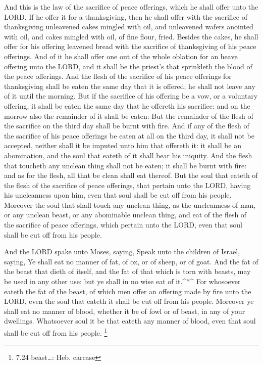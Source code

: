  And this is the law of the sacrifice of peace offerings,
which he shall offer unto the LORD.  If he offer it for a
thanksgiving, then he shall offer with the sacrifice of thanksgiving
unleavened cakes mingled with oil, and unleavened wafers anointed with
oil, and cakes mingled with oil, of fine flour, fried. 
Besides the cakes, he shall offer for his offering leavened bread with
the sacrifice of thanksgiving of his peace offerings.  And
of it he shall offer one out of the whole oblation for an heave offering
unto the LORD, and it shall be the priest's that sprinkleth the blood of
the peace offerings.  And the flesh of the sacrifice of his
peace offerings for thanksgiving shall be eaten the same day that it is
offered; he shall not leave any of it until the morning. 
But if the sacrifice of his offering be a vow, or a voluntary offering,
it shall be eaten the same day that he offereth his sacrifice: and on
the morrow also the remainder of it shall be eaten:  But
the remainder of the flesh of the sacrifice on the third day shall be
burnt with fire.  And if any of the flesh of the sacrifice
of his peace offerings be eaten at all on the third day, it shall not be
accepted, neither shall it be imputed unto him that offereth it: it
shall be an abomination, and the soul that eateth of it shall bear his
iniquity.  And the flesh that toucheth any unclean thing
shall not be eaten; it shall be burnt with fire: and as for the flesh,
all that be clean shall eat thereof.  But the soul that
eateth of the flesh of the sacrifice of peace offerings, that pertain
unto the LORD, having his uncleanness upon him, even that soul shall be
cut off from his people.  Moreover the soul that shall
touch any unclean thing, as the uncleanness of man, or any unclean
beast, or any abominable unclean thing, and eat of the flesh of the
sacrifice of peace offerings, which pertain unto the LORD, even that
soul shall be cut off from his people.

 And the LORD spake unto Moses, saying,  Speak
unto the children of Israel, saying, Ye shall eat no manner of fat, of
ox, or of sheep, or of goat.  And the fat of the beast that
dieth of itself, and the fat of that which is torn with beasts, may be
used in any other use: but ye shall in no wise eat of it.\^{}*\^{}
 For whosoever eateth the fat of the beast, of which men
offer an offering made by fire unto the LORD, even the soul that eateth
it shall be cut off from his people.  Moreover ye shall eat
no manner of blood, whether it be of fowl or of beast, in any of your
dwellings.  Whatsoever soul it be that eateth any manner of
blood, even that soul shall be cut off from his people. \footnote{7.24
  beast\ldots: Heb. carcase}


